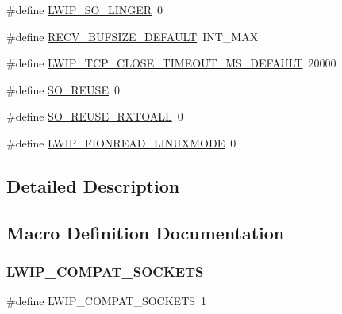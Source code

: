 \begin{DoxyCompactItemize}
\item 
\#define \hyperlink{group__lwip__opts__socket_gaa91292d5d014dc1c6f1c1f4166269a1d}{L\+W\+I\+P\+\_\+\+S\+O\+\_\+\+L\+I\+N\+G\+ER}~0
\item 
\#define \hyperlink{group__lwip__opts__socket_ga5dbd0a61f30ae6c6bfbda635095f138d}{R\+E\+C\+V\+\_\+\+B\+U\+F\+S\+I\+Z\+E\+\_\+\+D\+E\+F\+A\+U\+LT}~I\+N\+T\+\_\+\+M\+AX
\item 
\#define \hyperlink{group__lwip__opts__socket_ga3e7498d5d2921f0df3792de72f384d36}{L\+W\+I\+P\+\_\+\+T\+C\+P\+\_\+\+C\+L\+O\+S\+E\+\_\+\+T\+I\+M\+E\+O\+U\+T\+\_\+\+M\+S\+\_\+\+D\+E\+F\+A\+U\+LT}~20000
\item 
\#define \hyperlink{group__lwip__opts__socket_gaf3822feed320cf8439b083ee525e4942}{S\+O\+\_\+\+R\+E\+U\+SE}~0
\item 
\#define \hyperlink{group__lwip__opts__socket_gae9395d83af89002343e5782130f52f44}{S\+O\+\_\+\+R\+E\+U\+S\+E\+\_\+\+R\+X\+T\+O\+A\+LL}~0
\item 
\#define \hyperlink{group__lwip__opts__socket_ga0543eea2abe390d0bdc843c33debd762}{L\+W\+I\+P\+\_\+\+F\+I\+O\+N\+R\+E\+A\+D\+\_\+\+L\+I\+N\+U\+X\+M\+O\+DE}~0
\end{DoxyCompactItemize}


\subsection{Detailed Description}


\subsection{Macro Definition Documentation}
\mbox{\label{group__lwip__opts__socket_gafed2811f031822ec5afa1ee211fb7447}} 
\subsubsection{\texorpdfstring{L\+W\+I\+P\+\_\+\+C\+O\+M\+P\+A\+T\+\_\+\+S\+O\+C\+K\+E\+TS}{LWIP\_COMPAT\_SOCKETS}\hspace{0.1cm}{\footnotesize\ttfamily [1/2]}}
{\footnotesize\ttfamily \#define L\+W\+I\+P\+\_\+\+C\+O\+M\+P\+A\+T\+\_\+\+S\+O\+C\+K\+E\+TS~1}

